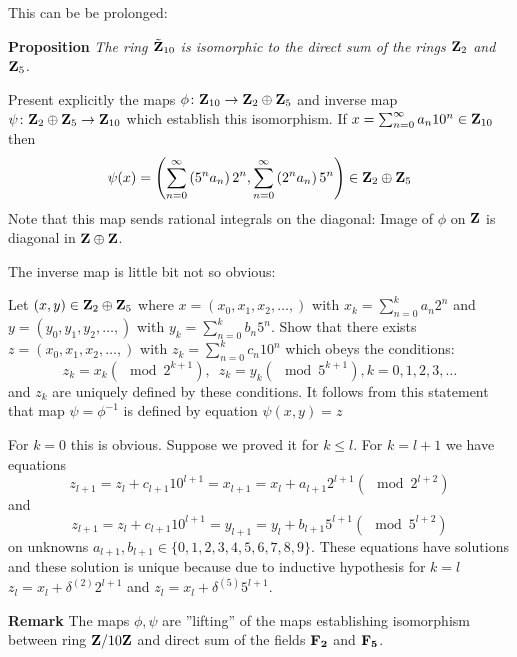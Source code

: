 This can be be prolonged:



\smallskip

  {\bf Proposition}  {\it The ring $\tilde{{\bf Z}}_{10}$ is isomorphic to the direct sum of the rings ${\bf Z}_2$ and ${\bf Z}_5$.}

\medskip

  Present explicitly the maps $\phi\colon {\bf Z}_{10}\to {\bf Z}_2\oplus {\bf Z}_5$ and inverse map $\psi\colon {\bf Z}_2\oplus {\bf Z}_5\to {\bf Z}_{10}$
  which establish this isomorphism.
  If $x=\sum_{n=0}^\infty a_n 10^n\in {\bf Z}_{10}$ then
                   $$
    \psi(x)=\left(\sum_{n=0}^\infty \left(5^n a_n\right) 2^n,\sum_{n=0}^\infty \left(2^n a_n\right) 5^n\right)
    \in {\bf Z}_2\oplus {\bf Z}_{5}
                   $$
Note that this map sends rational integrals on the diagonal: Image of $\phi$ on ${\bf Z}$ is diagonal in ${\bf Z}\oplus {\bf Z}$.

  The inverse map is little bit not so obvious:

 Let $(x,y)\in {\bf Z}_2\oplus {\bf Z}_{5}$ where $x=(x_0,x_1,x_2,\dots,)$ with $x_k=\sum_{n=0}^k a_n 2^n$
 and $y=(y_0,y_1,y_2,\dots,)$ with $y_k=\sum_{n=0}^k b_n 5^n$. Show that there exists
  $z=(x_0,x_1,x_2,\dots,)$ with $z_k=\sum_{n=0}^k c_n 10^n$ which obeys the conditions:
                                    $$
              z_k=x_k (\mod 2^{k+1}),\,\,\,z_k=y_k (\mod 5^{k+1}), k=0,1,2,3,\dots
                                    $$
 and $z_k$ are uniquely defined by these conditions. It follows from this statement that map $\psi=\phi^{-1}$
 is defined by equation $\psi(x,y)=z$

For $k=0$ this is obvious. Suppose we proved it for $k\leq l$.
 For $k=l+1$ we have equations
                $$
       z_{l+1}=z_l+c_{l+1}10^{l+1}=x_{l+1}=x_l+a_{l+1}2^{l+1}(\mod 2^{l+2})
                 $$
and
                $$
             z_{l+1}=z_l+c_{l+1}10^{l+1}=y_{l+1}=y_l+b_{l+1}5^{l+1}(\mod 5^{l+2})
                $$
on unknowns $a_{l+1}, b_{l+1}\in \{0,1,2,3,4,5,6,7,8,9\}$.
These equations have solutions and these solution is unique because due to inductive hypothesis
for $k=l$ $z_l=x_l+\delta^{(2)}2^{l+1}$ and $z_l=x_l+\delta^{(5)}5^{l+1}$.

{\bf Remark} The maps $\phi,\psi$ are ''lifting'' of the maps establishing isomorphism between
ring ${\bf Z}\slash 10{\bf Z}$ and direct sum of the fields $\bf F_2$ and $\bf F_5$.

\medskip


